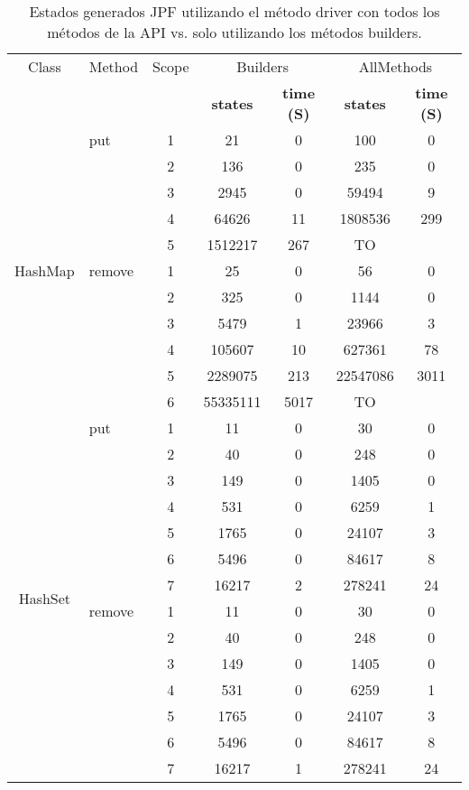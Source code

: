 \begin{table}[H]
\scriptsize
\begin{tabular}{ c| l| c c c c c}
\hline
Class & Method & Scope &
\multicolumn{2}{c}{\textsf{Builders}} &
\multicolumn{2}{c}{\textsf{AllMethods}} \\
&&&
\tiny{\textbf{states}} & \tiny{\textbf{time (S)}} &
\tiny{\textbf{states}} & \tiny{\textbf{time (S)} }\\
\hline
\multirow{11}{*}{HashMap} 
& put
 & 1 & 21& 0& 100 & 0 \\
& & 2 & 136& 0& 235 & 0 \\
& & 3 & 2945& 0& 59494 & 9 \\
& & 4 & 64626& 11&  1808536& 299 \\
& & 5 & 1512217& 267& TO&  \\

 \cline{2-7}

& remove
 & 1 &25 & 0& 56 & 0 \\
& & 2 &325 & 0& 1144 &  0\\
& & 3 & 5479& 1& 23966 & 3 \\
& & 4 & 105607& 10& 627361 &  78\\
& & 5 & 2289075& 213& 22547086 &3011  \\
& & 6 & 55335111 & 5017&TO &  \\

\hline

\multirow{14}{*}{HashSet} 
& put
  & 1 & 11  & 0 & 30  & 0 \\
& & 2 & 40  & 0 & 248 & 0 \\
& & 3 & 149 & 0 & 1405  & 0 \\
& & 4 & 531 & 0 & 6259  & 1 \\
& & 5 & 1765  & 0 & 24107 & 3 \\
& & 6 & 5496  & 0 & 84617 & 8 \\
& & 7 & 16217 & 2 & 278241  & 24  \\


\cline{2-7}

& remove
  & 1 & 11  & 0 & 30  & 0 \\
& & 2 & 40  & 0 & 248 & 0 \\
& & 3 & 149 & 0 & 1405  & 0 \\
& & 4 & 531 & 0 & 6259  & 1 \\
& & 5 & 1765  & 0 & 24107 & 3 \\
& & 6 & 5496  & 0 & 84617 & 8 \\
& & 7 & 16217 & 1 & 278241  & 24  \\

\hline

\end{tabular}%
\caption{Estados generados JPF utilizando el método driver con todos los métodos de la API vs. solo utilizando los métodos builders.}
\label{tab:results-jpf2}
 
\end{table}


